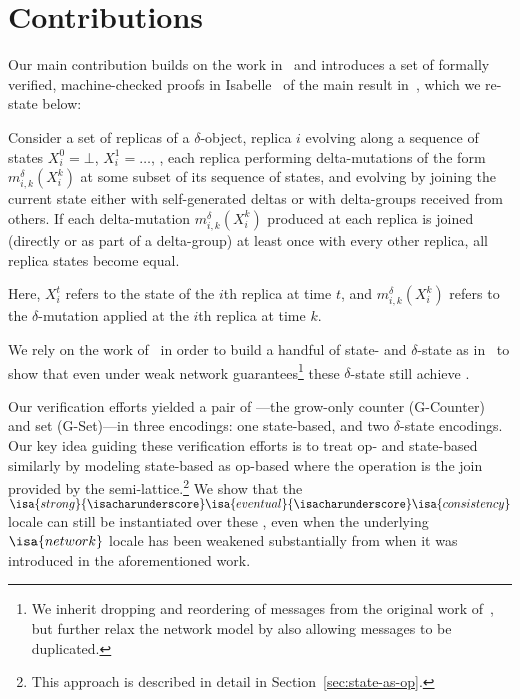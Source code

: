 \section{Contributions}

Our main contribution builds on the work in~\citet{gomes17} and introduces a set
of formally verified, machine-checked proofs in Isabelle~\citep{wenzel02} of the
main result in~\citet{almedia18}, which we re-state below:

\begin{theorem}
  Consider a set of replicas of a $\delta$-\CRDT object, replica $i$ evolving
  along a sequence of states $X_i^0 = \bot$, $X_i^1=\ldots$, , each replica
  performing delta-mutations of the form $m^\delta_{i,k}(X^k_i)$ at some subset
  of its sequence of states, and evolving by joining the current state either
  with self-generated deltas or with delta-groups received from others. If each
  delta-mutation $m^\delta _{i,k}(X^k_i)$ produced at each replica is joined
  (directly or as part of a delta-group) at least once with every other replica,
  all replica states become equal.
\end{theorem}

Here, $X_i^t$ refers to the state of the $i$th replica at time $t$, and
$m^\delta_{i,k}(X_i^k)$ refers to the $\delta$-mutation applied at the $i$th
replica at time $k$.

We rely on the work of~\citet{gomes17} in order to build a handful of state- and
$\delta$-state \CRDTs as in~\citet{almedia18} to show that even under weak
network guarantees\footnote{We inherit dropping and reordering of messages from
the original work of~\citet{gomes17}, but further relax the network model by
also allowing messages to be duplicated.} these $\delta$-state \CRDTs still
achieve \SEC.

Our verification efforts yielded a pair of \CRDTs---the grow-only counter
(G-Counter) and set (G-Set)---in three encodings: one state-based, and two
$\delta$-state encodings. Our key idea guiding these verification efforts is to
treat op- and state-based \CRDTs similarly by modeling state-based \CRDTs as
op-based where the operation is the join provided by the
semi-lattice.\footnote{This approach is described in detail in
Section~\ref{sec:state-as-op}.} We show that the
$\isa{strong}{\isacharunderscore}\isa{eventual}{\isacharunderscore}\isa{consistency}$
locale can still be instantiated over these \CRDTs, even when the underlying
$\isa{network}$ locale has been weakened substantially from when it was
introduced in the aforementioned work.

